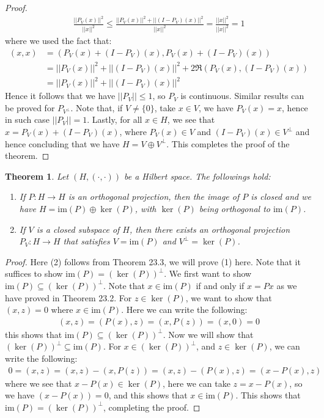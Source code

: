 \documentclass[11pt]{book}
\theoremstyle{break}
\theoremstyle{break}
\newtheorem{thm}{Theorem}[section]
\newcommand{\im}{\text{im}}
\begin{document}
\begin{proof}
\begin{align*}
\frac{||P_V(x)||^2}{||x||^2} \leq \frac{||P_V(x)||^2 + ||(I-P_V)(x)||^2}{||x||^2} = \frac{||x||^2}{||x||^2} = 1
\end{align*}
where we used the fact that: 
\begin{align*}
(x,x)&= (P_V(x) + (I-P_V)(x) , P_V(x)+(I-P_V)(x)) \\
&= ||P_V(x)||^2 + ||(I-P_V)(x)||^2 + 2\Re(P_V(x),(I-P_V)(x)) \\
&=||P_V(x)||^2 + ||(I-P_V)(x)||^2 
\end{align*}
Hence it follows that we have $||P_V|| \leq 1$, so $P_V$ is continuous. Similar results can be proved for $P_{V^\perp}$. Note that, if $V \neq \{0\}$, take $x \in V$, we have $P_V(x) = x$, hence in such case $||P_V|| = 1$. Lastly, for all $x \in H$, we see that $x = P_V(x) + (I-P_V)(x)$, where $P_V(x) \in V$ and $(I-P_V)(x) \in V^{\perp}$ and hence concluding that we have $H = V \oplus V^{\perp}$. This completes the proof of the theorem. 
\end{proof}


\begin{thm}
Let $(H, (\cdot, \cdot))$ be a Hilbert space. The followings hold:
\begin{enumerate}[topsep=3pt,itemsep=-1ex,partopsep=1ex,parsep=1ex]
\item If $P:H \to H$ is an orthogonal projection, then the image of $P$ is closed and we have $H = \im(P) \oplus \ker(P)$, with $\ker(P)$ being orthogonal to $\im(P)$.
\item If $V$ is a closed subspace of $H$, then there exists an orthogonal projection $P_V:H \to H$ that satisfies $V = \im(P)$ and $V^\perp = \ker(P)$. 
\end{enumerate} 
\end{thm}
\begin{proof}
Here (2) follows from Theorem 23.3, we will prove (1) here. Note that it suffices to show $\im(P) = (\ker(P))^{\perp}$. We first want to show $\im(P) \subseteq (\ker(P))^{\perp}$. Note that $x \in \im(P)$ if and only if $x = Px$ as we have proved in Theorem 23.2. For $z \in \ker(P)$, we want to show that $(x,z) = 0$ where $x \in \im(P)$. Here we can write the following:
\begin{align*}
(x,z) = (P(x), z) = (x, P(z)) = (x,0) = 0
\end{align*}
this shows that $\im(P) \subseteq (\ker(P))^\perp$. Now we will show that $(\ker(P))^\perp \subseteq \im(P)$. For $x \in (\ker(P))^{\perp}$, and $z \in \ker(P)$, we can write the following:
\begin{align*}
0 = (x,z) = (x,z) - (x,P(z)) = (x,z) - (P(x),z)=(x-P(x), z)
\end{align*}
where we see that $x - P(x) \in \ker(P)$, here we can take $z = x-P(x)$, so we have $(x-P(x)) = 0$, and this shows that $x \in \im(P)$. This shows that $\im(P) = (\ker(P))^{\perp}$, completing the proof. 
\end{proof}
\end{document}
